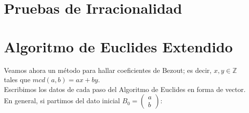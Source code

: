 \documentclass{report}
\begin{document}
\section{Pruebas de Irracionalidad}
\newpage\section{Algoritmo de Euclides Extendido}
Veamos ahora un método para hallar coeficientes de Bezout; es decir, $x,y\in\mathbb{Z}$ tales que $mcd(a,b)=ax+by$.\\
Escribimos los datos de cada paso del Algoritmo de Euclides en forma de vector.\\
En general, si partimos del dato inicial $B_0=\begin{pmatrix} a \\ b \end{pmatrix}$:
\end{document}
